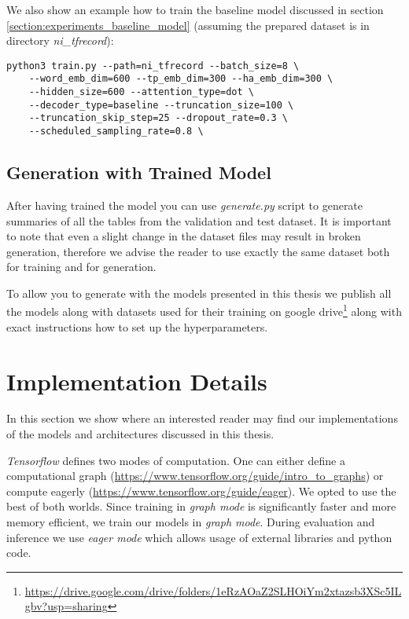 We also show an example how to train the baseline model discussed in section \ref{section:experiments_baseline_model} (assuming the prepared dataset is in directory \emph{ni\_tfrecord}):

\begin{verbatim}
python3 train.py --path=ni_tfrecord --batch_size=8 \
    --word_emb_dim=600 --tp_emb_dim=300 --ha_emb_dim=300 \
    --hidden_size=600 --attention_type=dot \
    --decoder_type=baseline --truncation_size=100 \
    --truncation_skip_step=25 --dropout_rate=0.3 \
    --scheduled_sampling_rate=0.8 \
\end{verbatim}

\subsection{Generation with Trained Model}

After having trained the model you can use \emph{generate.py} script to generate summaries of all the tables from the validation and test dataset. It is important to note that even a slight change in the dataset files may result in broken generation, therefore we advise the reader to use exactly the same dataset both for training and for generation.

To allow you to generate with the models presented in this thesis we publish all the models along with datasets used for their training on google drive\footnote{\url{https://drive.google.com/drive/folders/1eRzAOaZ2SLHOiYm2xtazsb3XSc5ILgbv?usp=sharing}} along with exact instructions how to set up the hyperparameters.

\section{Implementation Details}

In this section we show where an interested reader may find our implementations of the models and architectures discussed in this thesis.

\emph{Tensorflow} defines two modes of computation. One can either define a computational graph (\url{https://www.tensorflow.org/guide/intro_to_graphs}) or compute eagerly (\url{https://www.tensorflow.org/guide/eager}). We opted to use the best of both worlds. Since training in \emph{graph mode} is significantly faster and more memory efficient, we train our models in \emph{graph mode}. During evaluation and inference we use \emph{eager mode} which allows usage of external libraries and python code.

